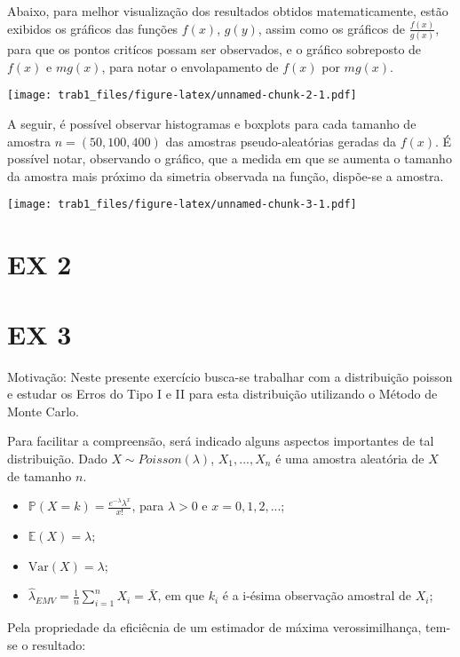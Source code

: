 \documentclass[11pt,]{article}
\begin{document}
Abaixo, para melhor visualização dos resultados obtidos matematicamente,
estão exibidos os gráficos das funções \(f(x)\), \(g(y)\), assim como os
gráficos de \(\frac{f(x)}{g(x)}\), para que os pontos critícos possam
ser observados, e o gráfico sobreposto de \(f(x)\) e \(mg(x)\), para
notar o envolapamento de \(f(x)\) por \(mg(x)\).

\texttt{[image: trab1\_files/figure-latex/unnamed-chunk-2-1.pdf]}

A seguir, é possível observar histogramas e boxplots para cada tamanho
de amostra \(n = (50, 100, 400)\) das amostras pseudo-aleatórias geradas
da \(f(x)\). É possível notar, observando o gráfico, que a medida em que
se aumenta o tamanho da amostra mais próximo da simetria observada na
função, dispõe-se a amostra.

\texttt{[image: trab1\_files/figure-latex/unnamed-chunk-3-1.pdf]}

\hypertarget{ex-2}{%
\section{EX 2}\label{ex-2}}

\hypertarget{ex-3}{%
\section{EX 3}\label{ex-3}}

Motivação: Neste presente exercício busca-se trabalhar com a
distribuição poisson e estudar os Erros do Tipo I e II para esta
distribuição utilizando o Método de Monte Carlo.

Para facilitar a compreensão, será indicado alguns aspectos importantes
de tal distribuição. Dado \(X \sim Poisson(\lambda)\), \(X_1, ..., X_n\)
é uma amostra aleatória de \(X\) de tamanho \(n\).

\begin{itemize}
\item
  \(\mathbb{P}(X=k)=\frac{e^{-\lambda}\lambda^x}{x!}\), para
  \(\lambda > 0\) e \(x = 0, 1, 2, ...\);
\item
  \(\mathbb{E}(X) = \lambda\);
\item
  \(\text{Var}(X) = \lambda\);
\item
  \(\hat{\lambda}_{EMV} = \frac{1}{n}\sum_{i=1}^n X_i = \bar{X}\), em
  que \(k_i\) é a i-ésima observação amostral de \(X_i\);
\end{itemize}

Pela propriedade da eficiêcnia de um estimador de máxima
verossimilhança, tem-se o resultado:
\end{document}
